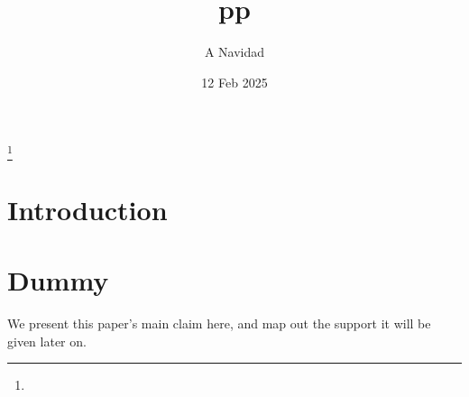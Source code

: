 \documentclass{amsart}
\theoremstyle{definition}%
\theoremstyle{definition}%
\theoremstyle{remark}%
\theoremstyle{definition}%
\theoremstyle{definition}%
\begin{document}
%
%
\title{pp}
\author{A Navidad}
\address{Harvard College, Cambridge MA}
\date{12 Feb 2025}
\thanks{\lipsum[1][1-3]}%
%
%
\begin{abstract}
\lipsum[1][1-6]
\end{abstract}
\keywords{\lipsum[1][1]}
%
%
\maketitle
%
%
%
%
\section{Introduction}
\label{s:intro}
\lipsum[1-2]
%
%
%
%
\section{Dummy}
\label{s:dummy}
We present this paper's main claim here, and map out the support it will be given later on.
%
%
\end{document}
